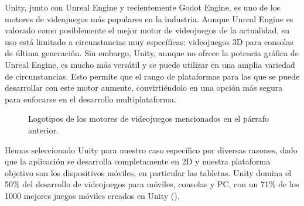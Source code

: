Unity, junto con Unreal Engine y recientemente Godot Engine, es uno de los motores de videojuegos más populares en la industria. Aunque Unreal Engine es valorado como posiblemente el mejor motor de videojuegos de la actualidad, su uso está limitado a circunstancias muy específicas: videojuegos 3D para consolas de última generación. Sin embargo, Unity, aunque no ofrece la potencia gráfica de Unreal Engine, es mucho más versátil y se puede utilizar en una amplia variedad de circunstancias. Esto permite que el rango de plataformas para las que se puede desarrollar con este motor aumente, convirtiéndolo en una opción más segura para enfocarse en el desarrollo multiplataforma.

\begin{figure}[h!]
	\centering
	\hfil
	\hfil
	\caption[Logotipos de motores Unity, Unreal Engine y Godot Engine.]{Logotipos de los motores de videojuegos mencionados en el párrafo anterior.}
	\label{fig:GameEngineLogos}
\end{figure}

Hemos seleccionado Unity para nuestro caso específico por diversas razones, dado que la aplicación se desarrolla completamente en 2D y nuestra plataforma objetivo son los dispositivos móviles, en particular las tabletas. Unity domina el 50\% del desarrollo de videojuegos para móviles, consolas y PC, con un 71\% de los 1000 mejores juegos móviles creados en Unity (\cite{PLARIUM:2024}).

